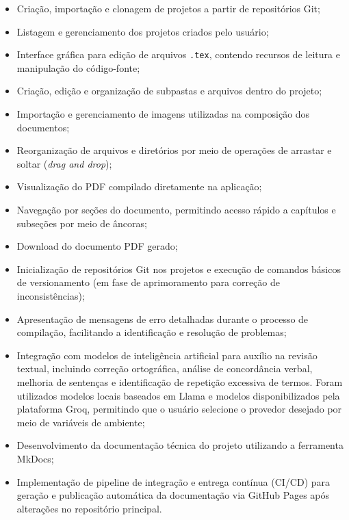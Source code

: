 \begin{itemize}
    \item Criação, importação e clonagem de projetos a partir de repositórios Git;

    \item Listagem e gerenciamento dos projetos criados pelo usuário;

    \item Interface gráfica para edição de arquivos \texttt{.tex}, contendo recursos de leitura e manipulação do código-fonte;

    \item Criação, edição e organização de subpastas e arquivos dentro do projeto;

    \item Importação e gerenciamento de imagens utilizadas na composição dos documentos;

    \item Reorganização de arquivos e diretórios por meio de operações de arrastar e soltar (\textit{drag and drop});

    \item Visualização do PDF compilado diretamente na aplicação;

    \item Navegação por seções do documento, permitindo acesso rápido a capítulos e subseções por meio de âncoras;

    \item Download do documento PDF gerado;

    \item Inicialização de repositórios Git nos projetos e execução de comandos básicos de versionamento (em fase de aprimoramento para correção de inconsistências);

    \item Apresentação de mensagens de erro detalhadas durante o processo de compilação, facilitando a identificação e resolução de problemas;

    \item Integração com modelos de inteligência artificial para auxílio na revisão textual, incluindo correção ortográfica, análise de concordância verbal, melhoria de sentenças e identificação de repetição excessiva de termos. Foram utilizados modelos locais baseados em Llama e modelos disponibilizados pela plataforma Groq, permitindo que o usuário selecione o provedor desejado por meio de variáveis de ambiente;

    \item Desenvolvimento da documentação técnica do projeto utilizando a ferramenta MkDocs;

    \item Implementação de pipeline de integração e entrega contínua (CI/CD) para geração e publicação automática da documentação via GitHub Pages após alterações no repositório principal.
\end{itemize}

